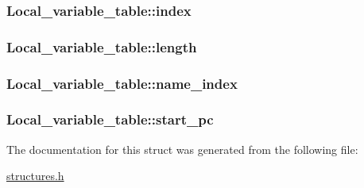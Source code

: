 \subsubsection[{\texorpdfstring{index}{index}}]{ Local\+\_\+variable\+\_\+table\+::index}\hypertarget{structLocal__variable__table_aa9c60b3758f3edc8c4761af238e576a9}{}\label{structLocal__variable__table_aa9c60b3758f3edc8c4761af238e576a9}
\subsubsection[{\texorpdfstring{length}{length}}]{ Local\+\_\+variable\+\_\+table\+::length}\hypertarget{structLocal__variable__table_aa7ed2c337f001f6922abef82a7a2877b}{}\label{structLocal__variable__table_aa7ed2c337f001f6922abef82a7a2877b}
\subsubsection[{\texorpdfstring{name\+\_\+index}{name_index}}]{ Local\+\_\+variable\+\_\+table\+::name\+\_\+index}\hypertarget{structLocal__variable__table_ae14ab32d3cf126ede896ea6b1a7053a2}{}\label{structLocal__variable__table_ae14ab32d3cf126ede896ea6b1a7053a2}
\subsubsection[{\texorpdfstring{start\+\_\+pc}{start_pc}}]{ Local\+\_\+variable\+\_\+table\+::start\+\_\+pc}\hypertarget{structLocal__variable__table_a857ab3f5a0d3a22f1eb7eccdd9c034e1}{}\label{structLocal__variable__table_a857ab3f5a0d3a22f1eb7eccdd9c034e1}


The documentation for this struct was generated from the following file\+:\begin{DoxyCompactItemize}
\item 
\hyperlink{structures_8h}{structures.\+h}\end{DoxyCompactItemize}
